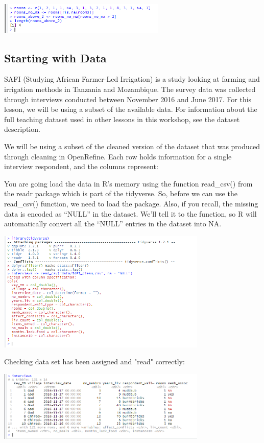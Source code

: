 \documentclass{article}
\begin{document}
\includegraphics[width=8cm]{Images/RStudio015.PNG}

\subsection{Starting with Data}

SAFI (Studying African Farmer-Led Irrigation) is a study looking at farming and irrigation methods in Tanzania and Mozambique. The survey data was collected through interviews conducted between November 2016 and June 2017. For this lesson, we will be using a subset of the available data. For information about the full teaching dataset used in other lessons in this workshop, see the dataset description.

We will be using a subset of the cleaned version of the dataset that was produced through cleaning in OpenRefine. Each row holds information for a single interview respondent, and the columns represent:

You are going load the data in R’s memory using the function read\_csv() from the readr package which is part of the tidyverse. So, before we can use the read\_csv() function, we need to load the package. Also, if you recall, the missing data is encoded as “NULL” in the dataset. We’ll tell it to the function, so R will automatically convert all the “NULL” entries in the dataset into NA.


\includegraphics[width=10cm]{Images/RStudio016.PNG}

Checking data set has been assigned and "read" correctly:

\includegraphics[width=10cm]{Images/RStudio017.PNG}
\end{document}
